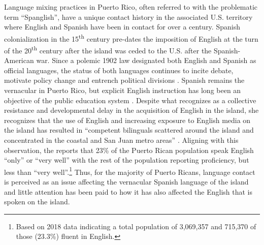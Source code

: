 \documentclass[output=paper,colorlinks,citecolor=brown]{langscibook}
\begin{document}
Language mixing practices in Puerto Rico, often referred to with the problematic term “Spanglish”, have a unique contact history in the associated U.S. territory where English and Spanish have been in contact for over a century. Spanish colonialization in the 15\textsuperscript{th} century pre-dates the imposition of English at the turn of the 20\textsuperscript{th} century after the island was ceded to the U.S. after the Spanish-American war. Since a polemic 1902 law designated both English and Spanish as official languages, the status of both languages continues to incite debate, motivate policy change and entrench political divisions \citep{MunizArguelles_1989}. Spanish remains the vernacular in Puerto Rico, but explicit English instruction has long been an objective of the public education system \citep{TorresGonzales_2002}. Despite what \citet[17]{Pousada_2006} recognizes as a collective resistance and developmental delay in the acquisition of English in the island, she recognizes that the use of English and increasing exposure to English media on the island has resulted in “competent bilinguals scattered around the island and concentrated in the coastal and San Juan metro areas” \citep[1]{Pousada_2017}. Aligning with this observation, the \citet[February 17]{US_Census_Bureau_2020} reports that 23\% of the Puerto Rican population speak English “only” or “very well” with the rest of the population reporting proficiency, but less than “very well”.\footnote{Based on 2018 data indicating a total population of 3,069,357 and 715,370 of those (23.3\%) fluent in English.} Thus, for the majority of Puerto Ricans, language contact is perceived as an issue affecting the vernacular Spanish language of the island and little attention has been paid to how it has also affected the English that is spoken on the island.
\end{document}
